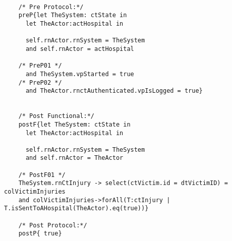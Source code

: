 	\scriptsize
	\vspace{0.5cm}
	\begin{lstlisting}[style=MessirStyle,firstnumber=auto,captionpos=b,caption={\msrmessir (MCL-oriented) specification of the operation \emph{oeGetHospitalInjurySet}.},label=OM-actHospital-oeGetHospitalInjurySet-MCL-LST]

	/* Pre Protocol:*/ 
	preP{let TheSystem: ctState in
	  let TheActor:actHospital in
	  
	  self.rnActor.rnSystem = TheSystem
	  and self.rnActor = actHospital
	  
	/* PreP01 */
	  and TheSystem.vpStarted = true
	/* PreP02 */
	  and TheActor.rnctAuthenticated.vpIsLogged = true}
	
	
	/* Post Functional:*/ 
	postF{let TheSystem: ctState in
	  let TheActor:actHospital in
	  
	  self.rnActor.rnSystem = TheSystem
	  and self.rnActor = TheActor
	  
	/* PostF01 */
	TheSystem.rnCtInjury -> select(ctVictim.id = dtVictimID) = colVictimInjuries
	and colVictimInjuries->forAll(T:ctInjury | T.isSentToAHospital(TheActor).eq(true))}
	
	/* Post Protocol:*/ 
	postP{ true}
	
	\end{lstlisting}
	\normalsize 
	
	
	
	






